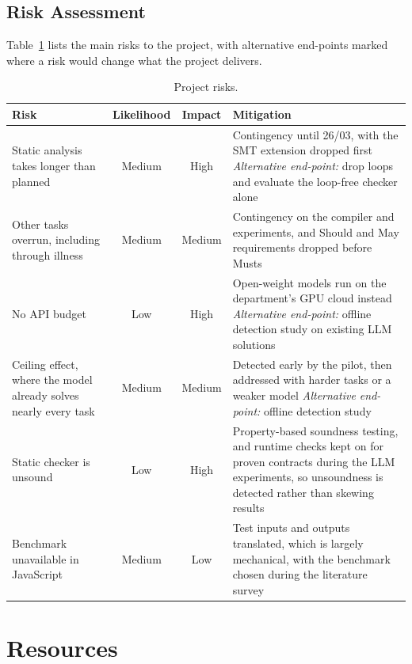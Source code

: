 \documentclass[11pt,a4paper,titlepage]{article}
\begin{document}
\subsection{Risk Assessment}

Table~\ref{tab:risks} lists the main risks to the project, with alternative end-points marked where a risk would change what the project delivers.

\begin{table}[H]
\centering
\small
\renewcommand{\arraystretch}{1.2}
\setlength{\tabcolsep}{4.5pt}
\begin{tabularx}{\textwidth}{@{}>{\raggedright}p{4.2cm} c c >{\raggedright\arraybackslash}X@{}}
\toprule
Risk & Likelihood & Impact & Mitigation \\
\midrule
Static analysis takes longer than planned & Medium & High & Contingency until 26/03, with the SMT extension dropped first \newline \emph{Alternative end-point:} drop loops and evaluate the loop-free checker alone \\
Other tasks overrun, including through illness & Medium & Medium & Contingency on the compiler and experiments, and Should and May requirements dropped before Musts \\
No API budget & Low & High & Open-weight models run on the department's GPU cloud instead \newline \emph{Alternative end-point:} offline detection study on existing LLM solutions \\
Ceiling effect, where the model already solves nearly every task & Medium & Medium & Detected early by the pilot, then addressed with harder tasks or a weaker model \newline \emph{Alternative end-point:} offline detection study \\
Static checker is unsound & Low & High & Property-based soundness testing, and runtime checks kept on for proven contracts during the LLM experiments, so unsoundness is detected rather than skewing results \\
Benchmark unavailable in JavaScript & Medium & Low & Test inputs and outputs translated, which is largely mechanical, with the benchmark chosen during the literature survey \\
\bottomrule
\end{tabularx}
\caption{Project risks.}
\label{tab:risks}
\end{table}

\section{Resources}
\end{document}

